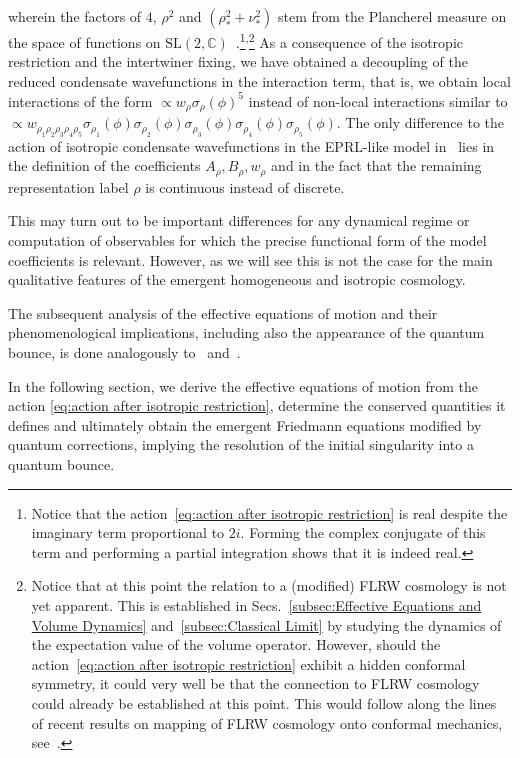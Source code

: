 \documentclass[11pt,a4paper]{article}
\newcommand{\C}{\mathbb C}
\newcommand{\SL}{\text{SL$(2,\C)$}}
\begin{document}
wherein the factors of $4$, $\rho^2$ and $(\rho_*^2+\nu_*^2)$ stem from the Plancherel measure on the space of functions on $\SL$~\cite{Speziale:2016axj}.\footnote{Notice that the action~\eqref{eq:action after isotropic restriction} is real despite the imaginary term proportional to $2i$. Forming the complex conjugate of this term and performing a partial integration shows that it is indeed real.}\textsuperscript{,}\footnote{Notice that at this point the relation to a (modified) FLRW cosmology is not yet apparent. This is established in Secs.~\ref{subsec:Effective Equations and Volume Dynamics} and~\ref{subsec:Classical Limit} by studying the dynamics of the expectation value of the volume operator. However, should the action~\eqref{eq:action after isotropic restriction} exhibit a hidden conformal symmetry, it could very well be that the connection to FLRW cosmology could already be established at this point. This would follow along the lines of recent results on mapping of FLRW cosmology onto conformal mechanics, see~\cite{BenAchour:2019ufa,BenAchour:2020njq,Achour:2021lqq}.} As a consequence of the isotropic restriction and the intertwiner fixing, we have obtained a decoupling of the reduced condensate wavefunctions in the interaction term, that is, we obtain local interactions of the form $\propto w_{\rho}\sigma_{\rho}(\phi)^5$ instead of non-local interactions similar to $\propto w_{\rho_1 \rho_2 \rho_3 \rho_4 \rho_5}\sigma_{\rho_1}(\phi)\sigma_{\rho_2}(\phi)\sigma_{\rho_3}(\phi)\sigma_{\rho_4}(\phi)\sigma_{\rho_5}(\phi)$. The only difference  to the action of isotropic condensate wavefunctions in the EPRL-like model in~\cite{Marchetti:2020umh} lies in the definition of the coefficients $A_{\rho},B_{\rho},w_{\rho}$ and in the fact that the remaining representation label $\rho$ is continuous instead of discrete. 

This may turn out to be important differences for any dynamical regime or computation of observables for which the precise functional form of the model coefficients is relevant. However, as we will see this is not the case for the main qualitative features of the emergent homogeneous and isotropic cosmology.

The subsequent analysis of the effective equations of motion and their phenomenological implications, including also the appearance of the quantum bounce, is done analogously to~\cite{Oriti:2016qtz} and~\cite{Marchetti:2020umh}.

In the following section, we derive the effective equations of motion from the action \eqref{eq:action after isotropic restriction}, determine the conserved quantities it defines and ultimately obtain the emergent Friedmann equations modified by quantum corrections, implying the resolution of the initial singularity into a quantum bounce.
\end{document}
